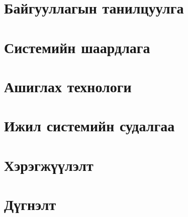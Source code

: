 
\chapter{Байгууллагын танилцуулга}


\chapter{Системийн шаардлага}


\chapter{Ашиглах технологи}


\chapter{Ижил системийн судалгаа}


% 

\chapter{Хэрэгжүүлэлт}


\chapter{Дүгнэлт}
